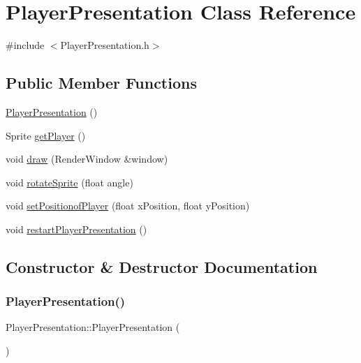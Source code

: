 \hypertarget{class_player_presentation}{}\section{Player\+Presentation Class Reference}
\label{class_player_presentation}


{\ttfamily \#include $<$Player\+Presentation.\+h$>$}

\subsection*{Public Member Functions}
\begin{DoxyCompactItemize}
\item 
\hyperlink{class_player_presentation_ae5b2e1e54cb57697d020eb1afe45225f}{Player\+Presentation} ()
\item 
Sprite \hyperlink{class_player_presentation_a5ce015d2ac13d9e3eacf89b96da31ee2}{get\+Player} ()
\item 
void \hyperlink{class_player_presentation_a0ee08eeb4f0c8687450f60d635b4fe8a}{draw} (Render\+Window \&window)
\item 
void \hyperlink{class_player_presentation_af938e83bf3a90263076411e0935731bd}{rotate\+Sprite} (float angle)
\item 
void \hyperlink{class_player_presentation_aef6ba74848a34fb93528062bda98059e}{set\+Positionof\+Player} (float x\+Position, float y\+Position)
\item 
void \hyperlink{class_player_presentation_ae4bf63751b63f582902d4ea31e06a486}{restart\+Player\+Presentation} ()
\end{DoxyCompactItemize}


\subsection{Constructor \& Destructor Documentation}
\mbox{\label{class_player_presentation_ae5b2e1e54cb57697d020eb1afe45225f}} 
\subsubsection{\texorpdfstring{Player\+Presentation()}{PlayerPresentation()}}
{\footnotesize\ttfamily Player\+Presentation\+::\+Player\+Presentation (\begin{DoxyParamCaption}{ }\end{DoxyParamCaption})}



